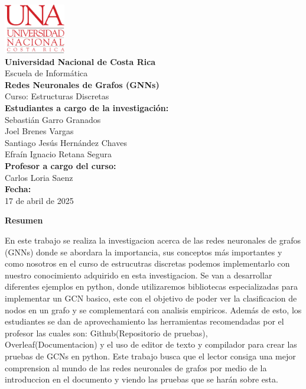 \documentclass[11pt]{article} %
\begin{document}
\begin{titlepage}
    \thispagestyle{empty}
    \begin{spacing}{1.5}
    \begin{center}
        \includegraphics[width=0.2\textwidth]{Images/LogoUNA.svg.png} \\[30pt]
        {\Large \textbf{Universidad Nacional de Costa Rica}} \\[20pt] 
        {\Large Escuela de Informática} \\[20pt]
        {\Large \textbf{Redes Neuronales de Grafos (GNNs)}} \\[20pt]
        {\Large Curso: Estructuras Discretas} \\[20pt]
        {\Large \textbf{Estudiantes a cargo de la investigación:}} \\[10pt]
        {\large Sebastián Garro Granados \\ Joel Brenes Vargas \\ Santiago Jesús Hernández Chaves \\ Efraín Ignacio Retana Segura} \\[20pt]
        {\Large \textbf{Profesor a cargo del curso:}} \\[15pt]
        {\large Carlos Loria Saenz} \\[120pt]
        {\Large \textbf{Fecha:}} \\[15pt]
        {\large 17 de abril de 2025}
    \end{center}
    \end{spacing}
\end{titlepage}

\newpage
\thispagestyle{empty}
{\large \textbf{Resumen}}
\vspace{5pt}

En este trabajo se realiza la investigacion acerca de las redes neuronales de grafos (GNNs) donde se abordara la importancia, sus conceptos más importantes y como nosotros en el curso de estrucutras discretas podemos implementarlo con nuestro conocimiento adquirido en esta investigacion. Se van a desarrollar diferentes ejemplos en python, donde utilizaremos bibliotecas especializadas para implementar un GCN basico, este con el objetivo de poder ver la clasificacion de nodos en un grafo y se complementará con analisis empiricos. Además de esto, los estudiantes se dan de aprovechamiento las herramientas recomendadas por el profesor las cuales son: Github(Repositorio de pruebas), Overleaf(Documentacion) y el uso de editor de texto y compilador para crear las pruebas de GCNs en python. Este trabajo busca que el lector consiga una mejor comprension al mundo de las redes neuronales de grafos por medio de la introduccion en el documento y viendo las pruebas que se harán sobre esta. %
\end{document}
